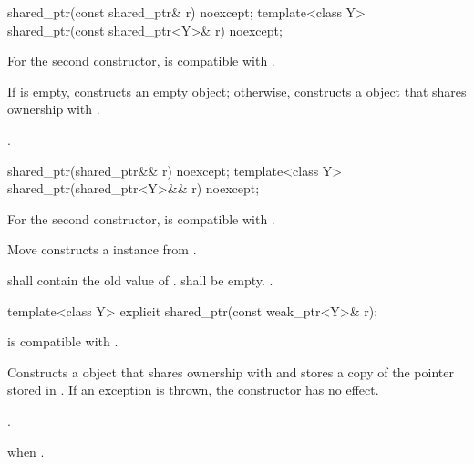 %
\begin{itemdecl}
shared_ptr(const shared_ptr& r) noexcept;
template<class Y> shared_ptr(const shared_ptr<Y>& r) noexcept;
\end{itemdecl}

\begin{itemdescr}
\pnum
\constraints
For the second constructor,  is compatible with .

\pnum
\effects
If  is empty, constructs
an empty  object; otherwise, constructs
a  object that shares ownership with .

\pnum
\ensures
{}.
\end{itemdescr}

%
\begin{itemdecl}
shared_ptr(shared_ptr&& r) noexcept;
template<class Y> shared_ptr(shared_ptr<Y>&& r) noexcept;
\end{itemdecl}

\begin{itemdescr}
\pnum
\constraints
For the second constructor,  is compatible with .

\pnum
\effects
Move constructs a  instance from .

\pnum
\ensures
{} shall contain the old value of
.  shall be empty. .
\end{itemdescr}

%
%
\begin{itemdecl}
template<class Y> explicit shared_ptr(const weak_ptr<Y>& r);
\end{itemdecl}

\begin{itemdescr}
\pnum
\constraints
{} is compatible with .

\pnum
\effects
Constructs a  object that shares ownership with
 and stores a copy of the pointer stored in .
If an exception is thrown, the constructor has no effect.

\pnum
\ensures
{}.

\pnum
\throws
{} when .
\end{itemdescr}

